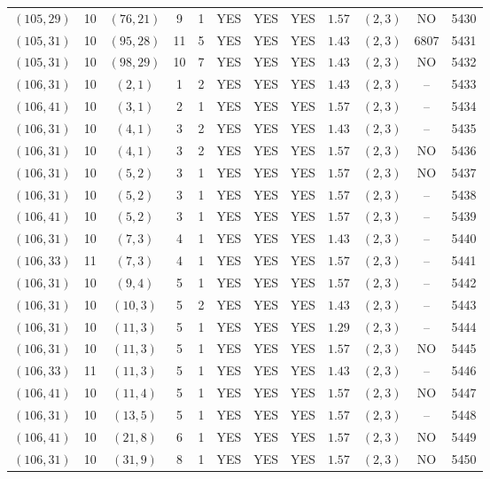 \begin{longtable}{|c|c|c|c|c|c|c|c|c|c|c|c|}
$(105,29)$ & 10 & $(76,21)$ & 9 & 1 & YES & YES & YES & $1.57$ & $(2,3)$ & NO & 5430\\
$(105,31)$ & 10 & $(95,28)$ & 11 & 5 & YES & YES & YES & $1.43$ & $(2,3)$ & 6807 & 5431\\
$(105,31)$ & 10 & $(98,29)$ & 10 & 7 & YES & YES & YES & $1.43$ & $(2,3)$ & NO & 5432\\
$(106,31)$ & 10 & $(2,1)$ & 1 & 2 & YES & YES & YES & $1.43$ & $(2,3)$ & -- & 5433\\
$(106,41)$ & 10 & $(3,1)$ & 2 & 1 & YES & YES & YES & $1.57$ & $(2,3)$ & -- & 5434\\
$(106,31)$ & 10 & $(4,1)$ & 3 & 2 & YES & YES & YES & $1.43$ & $(2,3)$ & -- & 5435\\
$(106,31)$ & 10 & $(4,1)$ & 3 & 2 & YES & YES & YES & $1.57$ & $(2,3)$ & NO & 5436\\
$(106,31)$ & 10 & $(5,2)$ & 3 & 1 & YES & YES & YES & $1.57$ & $(2,3)$ & NO & 5437\\
$(106,31)$ & 10 & $(5,2)$ & 3 & 1 & YES & YES & YES & $1.57$ & $(2,3)$ & -- & 5438\\
$(106,41)$ & 10 & $(5,2)$ & 3 & 1 & YES & YES & YES & $1.57$ & $(2,3)$ & -- & 5439\\
$(106,31)$ & 10 & $(7,3)$ & 4 & 1 & YES & YES & YES & $1.43$ & $(2,3)$ & -- & 5440\\
$(106,33)$ & 11 & $(7,3)$ & 4 & 1 & YES & YES & YES & $1.57$ & $(2,3)$ & -- & 5441\\
$(106,31)$ & 10 & $(9,4)$ & 5 & 1 & YES & YES & YES & $1.57$ & $(2,3)$ & -- & 5442\\
$(106,31)$ & 10 & $(10,3)$ & 5 & 2 & YES & YES & YES & $1.43$ & $(2,3)$ & -- & 5443\\
$(106,31)$ & 10 & $(11,3)$ & 5 & 1 & YES & YES & YES & $1.29$ & $(2,3)$ & -- & 5444\\
$(106,31)$ & 10 & $(11,3)$ & 5 & 1 & YES & YES & YES & $1.57$ & $(2,3)$ & NO & 5445\\
$(106,33)$ & 11 & $(11,3)$ & 5 & 1 & YES & YES & YES & $1.43$ & $(2,3)$ & -- & 5446\\
$(106,41)$ & 10 & $(11,4)$ & 5 & 1 & YES & YES & YES & $1.57$ & $(2,3)$ & NO & 5447\\
$(106,31)$ & 10 & $(13,5)$ & 5 & 1 & YES & YES & YES & $1.57$ & $(2,3)$ & -- & 5448\\
$(106,41)$ & 10 & $(21,8)$ & 6 & 1 & YES & YES & YES & $1.57$ & $(2,3)$ & NO & 5449\\
$(106,31)$ & 10 & $(31,9)$ & 8 & 1 & YES & YES & YES & $1.57$ & $(2,3)$ & NO & 5450\\

\end{longtable}
